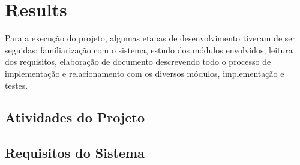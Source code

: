 \chapter{Results}

Para a execução do projeto, algumas etapas de desenvolvimento tiveram de ser seguidas: familiarização com o sistema, estudo dos módulos envolvidos, leitura dos requisitos, elaboração de documento descrevendo todo o processo de implementação e relacionamento com os diversos módulos, implementação e testes.


\section{Atividades do Projeto}
\label{metodo3}

\section {Requisitos do Sistema}
\label{req}


\clearpage